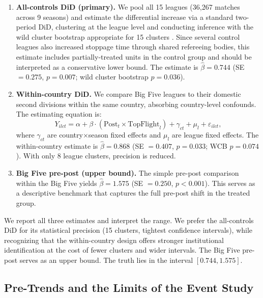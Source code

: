 \documentclass[12pt]{article}
\begin{document}
\begin{enumerate}[leftmargin=*]
\item \textbf{All-controls DiD (primary).} We pool all 15 leagues (36,267 matches across 9 seasons) and estimate the differential increase via a standard two-period DiD, clustering at the league level and conducting inference with the wild cluster bootstrap appropriate for 15 clusters \citep{cameron2008bootstrap}. Since several control leagues also increased stoppage time through shared refereeing bodies, this estimate includes partially-treated units in the control group and should be interpreted as a conservative lower bound. The estimate is $\hat{\beta} = 0.744$ (SE $= 0.275$, $p = 0.007$; wild cluster bootstrap $p = 0.036$).

\item \textbf{Within-country DiD.} We compare Big Five leagues to their domestic second divisions within the same country, absorbing country-level confounds. The estimating equation is:
\begin{equation}\label{eq:within}
  Y_{ilct} = \alpha + \beta \cdot (\text{Post}_t \times \text{TopFlight}_{l})
  + \gamma_{ct} + \mu_l + \varepsilon_{ilct},
\end{equation}
where $\gamma_{ct}$ are country$\times$season fixed effects and $\mu_l$ are league fixed effects. The within-country estimate is $\hat{\beta} = 0.868$ (SE $= 0.407$, $p = 0.033$; WCB $p = 0.074$). With only 8 league clusters, precision is reduced.

\item \textbf{Big Five pre-post (upper bound).} The simple pre-post comparison within the Big Five yields $\hat{\beta} = 1.575$ (SE $= 0.250$, $p < 0.001$). This serves as a descriptive benchmark that captures the full pre-post shift in the treated group.
\end{enumerate}

We report all three estimates and interpret the range. We prefer the all-controls DiD for its statistical precision (15 clusters, tightest confidence intervals), while recognizing that the within-country design offers stronger institutional identification at the cost of fewer clusters and wider intervals. The Big Five pre-post serves as an upper bound. The truth lies in the interval $[0.744, 1.575]$.

\subsection{Pre-Trends and the Limits of the Event Study}
\label{subsec:pretrends}
\end{document}
